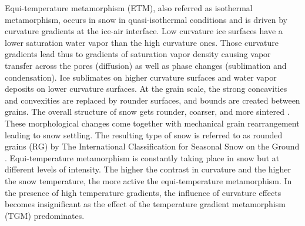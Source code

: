 \documentclass[draft,ms]{agujournal2019}
\begin{document}
Equi-temperature metamorphism (ETM), also referred as isothermal metamorphism, occurs in snow in quasi-isothermal conditions and is driven by curvature gradients at the ice-air interface. Low curvature ice surfaces have a lower saturation water vapor than the high curvature ones. Those curvature gradients lead thus to gradients of saturation vapor density causing vapor transfer across the pores (diffusion) as well as phase changes (sublimation and condensation). Ice sublimates on higher curvature surfaces and  water vapor deposits on lower curvature surfaces. At the grain scale, the strong concavities and convexities are replaced by rounder surfaces, and bounds are created between grains. The overall structure of snow gets rounder, coarser, and more sintered \cite{colbeck_thermodynamics_1980}. These morphological changes come together with mechanical grain rearrangement leading to snow settling. The resulting type of snow is referred to as rounded grains (RG) by The International Classification for Seasonal Snow on the Ground \cite{fierz2009international}. Equi-temperature metamorphism is constantly taking place in snow but at different levels of intensity. The higher the contrast in curvature and the higher the snow temperature, the more active the equi-temperature metamorphism. In the presence of high temperature gradients, the influence of curvature effects becomes insignificant as the effect of the temperature gradient metamorphism (TGM) predominates.\\
\end{document}
